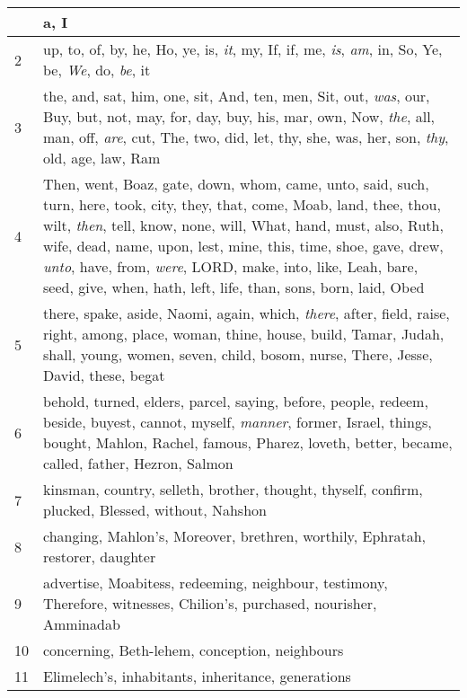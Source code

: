 \begin{longtable}{l|p{3.75in}}
\hline \hline
\endlastfoot
1 & a, I \\ \hline
2 & up, to, of, by, he, Ho, ye, is, \emph{it}, my, If, if, me, \emph{is}, \emph{am}, in, So, Ye, be, \emph{We}, do, \emph{be}, it \\ \hline
3 & the, and, sat, him, one, sit, And, ten, men, Sit, out, \emph{was}, our, Buy, but, not, may, for, day, buy, his, mar, own, Now, \emph{the}, all, man, off, \emph{are}, cut, The, two, did, let, thy, she, was, her, son, \emph{thy}, old, age, law, Ram \\ \hline
4 & Then, went, Boaz, gate, down, whom, came, unto, said, such, turn, here, took, city, they, that, come, Moab, land, thee, thou, wilt, \emph{then}, tell, know, none, will, What, hand, must, also, Ruth, wife, dead, name, upon, lest, mine, this, time, shoe, gave, drew, \emph{unto}, have, from, \emph{were}, LORD, make, into, like, Leah, bare, seed, give, when, hath, left, life, than, sons, born, laid, Obed \\ \hline
5 & there, spake, aside, Naomi, again, which, \emph{there}, after, field, raise, right, among, place, woman, thine, house, build, Tamar, Judah, shall, young, women, seven, child, bosom, nurse, There, Jesse, David, these, begat \\ \hline
6 & behold, turned, elders, parcel, saying, before, people, redeem, beside, buyest, cannot, myself, \emph{manner}, former, Israel, things, bought, Mahlon, Rachel, famous, Pharez, loveth, better, became, called, father, Hezron, Salmon \\ \hline
7 & kinsman, country, selleth, brother, thought, thyself, confirm, plucked, Blessed, without, Nahshon \\ \hline
8 & changing, Mahlon's, Moreover, brethren, worthily, Ephratah, restorer, daughter \\ \hline
9 & advertise, Moabitess, redeeming, neighbour, testimony, Therefore, witnesses, Chilion's, purchased, nourisher, Amminadab \\ \hline
10 & concerning, Beth-lehem, conception, neighbours \\ \hline
11 & Elimelech's, inhabitants, inheritance, generations \\ \hline
\end{longtable}






